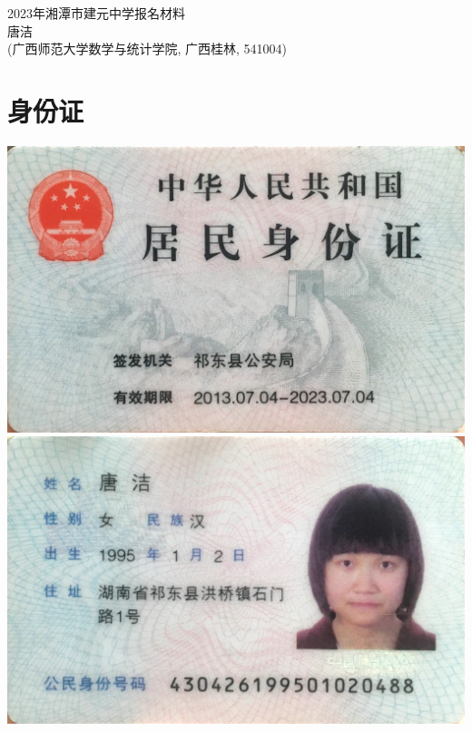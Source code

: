 \documentclass[UFT8]{ctexart}%
\begin{document}
\thispagestyle{empty} %
\vspace*{3cm}
\begin{center}
{{\LARGE\heiti 2023年湘潭市建元中学报名材料}\\[0.6cm]
{\normalsize 唐洁}\\[0.1cm]
{\small(广西师范大学数学与统计学院, 广西桂林, 541004)}}
\end{center}

\clearpage%
%

\tableofcontents%
\thispagestyle{empty} %

\clearpage%
\setcounter{page}{1}%

%

\section{身份证}
\begin{center}
  \includegraphics[scale=0.1]{figs/身份证1.JPG }
  \includegraphics[scale=0.1]{figs/身份证2.JPG }
\end{center}
\end{document}
